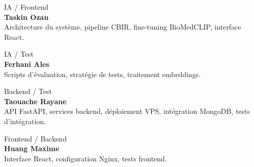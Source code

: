 \documentclass[12pt,a4paper]{article}
\begin{document}
\begin{minipage}[t]{0.47\textwidth}
\begin{tcolorbox}[
  equal height group=team,
  colback=white, colframe=gray!50,
  boxrule=1pt, arc=5pt,
  left=8pt, right=8pt, top=8pt, bottom=8pt,
  borderline west={3pt}{0pt}{[HTML]{1E293B}}
]
{\small\textcolor[HTML]{64748B}{IA / Frontend}}\\[0.2cm]
\textbf{Taskin Ozan}\\[0.15cm]
{\small Architecture du système, pipeline CBIR,
fine-tuning BioMedCLIP, interface React.}
\end{tcolorbox}
\end{minipage}
\hfill
\begin{minipage}[t]{0.47\textwidth}
\begin{tcolorbox}[
  equal height group=team,
  colback=white, colframe=gray!50,
  boxrule=1pt, arc=5pt,
  left=8pt, right=8pt, top=8pt, bottom=8pt,
  borderline west={3pt}{0pt}{[HTML]{1E293B}}
]
{\small\textcolor[HTML]{64748B}{IA / Test}}\\[0.2cm]
\textbf{Ferhani Ales}\\[0.15cm]
{\small Scripts d'évaluation, stratégie de tests, traitement embeddings.}
\end{tcolorbox}
\end{minipage}

\vspace{1.2cm}

\begin{minipage}[t]{0.47\textwidth}
\begin{tcolorbox}[
  equal height group=team,
  colback=white, colframe=gray!50,
  boxrule=1pt, arc=5pt,
  left=8pt, right=8pt, top=8pt, bottom=8pt,
  borderline west={3pt}{0pt}{[HTML]{1E293B}}
]
{\small\textcolor[HTML]{64748B}{Backend / Test}}\\[0.2cm]
\textbf{Taouache Rayane}\\[0.15cm]
{\small API FastAPI, services backend, déploiement VPS, intégration MongoDB, tests d'intégration.}
\end{tcolorbox}
\end{minipage}
\hfill
\begin{minipage}[t]{0.47\textwidth}
\begin{tcolorbox}[
  equal height group=team,
  colback=white, colframe=gray!50,
  boxrule=1pt, arc=5pt,
  left=8pt, right=8pt, top=8pt, bottom=8pt,
  borderline west={3pt}{0pt}{[HTML]{1E293B}}
]
{\small\textcolor[HTML]{64748B}{Frontend / Backend}}\\[0.2cm]
\textbf{Huang Maxime}\\[0.15cm]
{\small Interface React, configuration Nginx, tests frontend.}
\end{tcolorbox}
\end{minipage}
\end{document}
